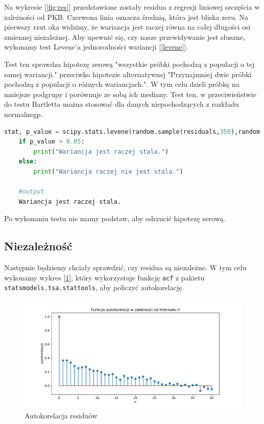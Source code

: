 \documentclass{article}
\theoremstyle{break}
\newcommand{\code}[1]{\colorbox{light-gray}{\texttt{#1}}}
\begin{document}
Na wykresie [\ref{fig:res}] przedstawione zostały residua z regresji liniowej szczęścia w zależności od PKB. Czerwona linia oznacza średnią, która jest bliska zeru. Na pierwszy rzut oka widzimy, że wariancja jest raczej równa na całej długości osi zmiennej niezależnej. Aby upewnić się, czy nasze przewidywanie jest słuszne, wykonamy test Levene'a jednorodności wariancji [\ref{levene}]. 

Test ten sprawdza hipotezę zerową "wszystkie próbki pochodzą z populacji o tej samej wariancji." przeciwko hipotezie alternatywnej "Przynajmniej dwie próbki pochodzą z populacji o różnych wariancjach.". W tym celu dzieli próbkę na mniejsze podgrupy i porównuje ze sobą ich mediany. Test ten, w przeciwieństwie do testu Bartletta można stosować dla danych niepochodzących z rozkładu normalnegp.

\begin{lstlisting}[language=Python, caption=Test Levene'a, label={levene}]
	stat, p_value = scipy.stats.levene(random.sample(residuals,350),random.sample(residuals,350))
	if p_value > 0.05:
		print("Wariancja jest raczej stala.")
	else:
		print("Wariancja raczej nie jest stala.")
		
	#output
	Wariancja jest raczej stala.
\end{lstlisting}

Po wykonaniu testu nie mamy podstaw, aby odrzucić hipotezę zerową.

\subsection{Niezależność}

Następnie będziemy chciały sprawdzić, czy residua są niezależne. W tym celu wykonamy wykres [\ref{fig:acor}], który wykorzystuje funkcję \code{acf} z pakietu \code{statsmodels.tsa.stattools}, aby policzyć autokorelację.

\begin{figure}[H]
	\begin{center}
		\includegraphics[scale=0.5]{acor.pdf}
		\caption{Autokorelacja residuów}
		\label{fig:acor}
	\end{center}
\end{figure}
\end{document}
